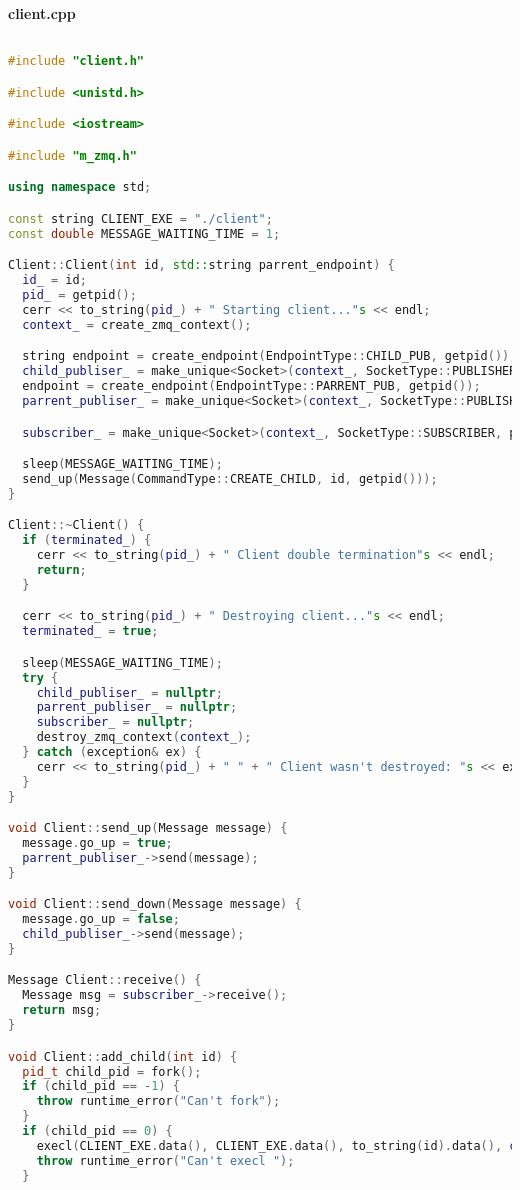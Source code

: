 \textbf{client.cpp}

\begin{lstlisting}[language=C++]

#include "client.h"

#include <unistd.h>

#include <iostream>

#include "m_zmq.h"

using namespace std;

const string CLIENT_EXE = "./client";
const double MESSAGE_WAITING_TIME = 1;

Client::Client(int id, std::string parrent_endpoint) {
  id_ = id;
  pid_ = getpid();
  cerr << to_string(pid_) + " Starting client..."s << endl;
  context_ = create_zmq_context();

  string endpoint = create_endpoint(EndpointType::CHILD_PUB, getpid());
  child_publiser_ = make_unique<Socket>(context_, SocketType::PUBLISHER, endpoint);
  endpoint = create_endpoint(EndpointType::PARRENT_PUB, getpid());
  parrent_publiser_ = make_unique<Socket>(context_, SocketType::PUBLISHER, endpoint);

  subscriber_ = make_unique<Socket>(context_, SocketType::SUBSCRIBER, parrent_endpoint);

  sleep(MESSAGE_WAITING_TIME);
  send_up(Message(CommandType::CREATE_CHILD, id, getpid()));
}

Client::~Client() {
  if (terminated_) {
    cerr << to_string(pid_) + " Client double termination"s << endl;
    return;
  }

  cerr << to_string(pid_) + " Destroying client..."s << endl;
  terminated_ = true;

  sleep(MESSAGE_WAITING_TIME);
  try {
    child_publiser_ = nullptr;
    parrent_publiser_ = nullptr;
    subscriber_ = nullptr;
    destroy_zmq_context(context_);
  } catch (exception& ex) {
    cerr << to_string(pid_) + " " + " Client wasn't destroyed: "s << ex.what() << endl;
  }
}

void Client::send_up(Message message) {
  message.go_up = true;
  parrent_publiser_->send(message);
}

void Client::send_down(Message message) {
  message.go_up = false;
  child_publiser_->send(message);
}

Message Client::receive() {
  Message msg = subscriber_->receive();
  return msg;
}

void Client::add_child(int id) {
  pid_t child_pid = fork();
  if (child_pid == -1) {
    throw runtime_error("Can't fork");
  }
  if (child_pid == 0) {
    execl(CLIENT_EXE.data(), CLIENT_EXE.data(), to_string(id).data(), child_publiser_->endpoint().data(), NULL);
    throw runtime_error("Can't execl ");
  }


\end{lstlisting}
